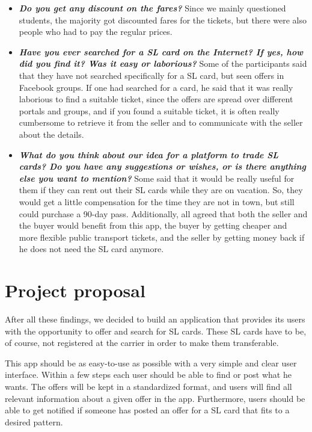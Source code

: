 \documentclass[11pt,twoside,a4paper]{report}
\begin{document}
\begin{itemize}
\item \textbf{\textit{Do you get any discount on the fares?}} Since we mainly questioned students, the majority got discounted fares for the tickets, but there were also people who had to pay the regular prices.
\item \textbf{\textit{Have you ever searched for a SL card on the Internet? If yes, how did you find it? Was it easy or laborious?}} Some of the participants said that they have not searched specifically for a SL card, but  seen offers in Facebook groups. If one had searched for a card, he said that it was really laborious to find a suitable ticket, since the offers are spread over different portals and groups, and if you found a suitable ticket, it is often really cumbersome to retrieve it from the seller and to communicate with the seller about the details.
\item \textbf{\textit{What do you think about our idea for a platform to trade SL cards? Do you have any suggestions or wishes, or is there anything else you want to mention?}} Some said that it would be really useful for them if they can rent out their SL cards while they are on vacation. So, they would get a little compensation for the time they are not in town, but still could purchase a 90-day pass. Additionally, all agreed that both the seller and the buyer would benefit from this app, the buyer by getting cheaper and more flexible public transport tickets, and the seller by getting money back if he does not need the SL card anymore.
\end{itemize}

\section{Project proposal}

After all these findings, we decided to build an application that provides its users with the opportunity to offer and search for SL cards. These SL cards have to be, of course, not registered at the carrier in order to make them transferable.

This app should be as easy-to-use as possible with a very simple and clear user interface. Within a few steps each user should be able to find or post what he wants. The offers will be kept in a standardized format, and users will find all relevant information about a given offer in the app. Furthermore, users should be able to get notified if someone has posted an offer for a SL card that fits to a desired pattern.
\end{document}
